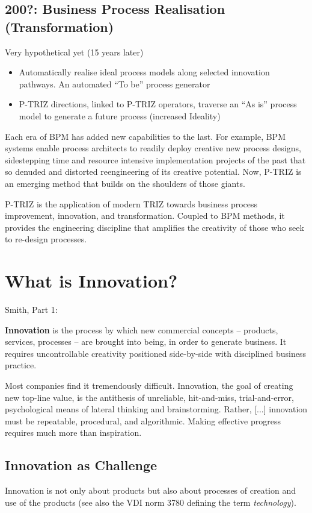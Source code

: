 \documentclass[11pt,a4paper]{article}
\begin{document}
\subsection{200?: Business Process Realisation (Transformation)}
Very hypothetical yet (15 years later)
\begin{itemize}
\item Automatically realise ideal process models along selected innovation
  pathways. An automated “To be” process generator
\item P-TRIZ directions, linked to P-TRIZ operators, traverse an “As is”
  process model to generate a future process (increased Ideality)
\end{itemize}

Each era of BPM has added new capabilities to the last. For example, BPM
systems enable process architects to readily deploy creative new process
designs, sidestepping time and resource intensive implementation projects of
the past that so denuded and distorted reengineering of its creative
potential. Now, P-TRIZ is an emerging method that builds on the shoulders of
those giants.

P-TRIZ is the application of modern TRIZ towards business process improvement,
innovation, and transformation. Coupled to BPM methods, it provides the
engineering discipline that amplifies the creativity of those who seek to
re-design processes.

\section{What is Innovation?}

Smith, Part 1:

\textbf{Innovation} is the process by which new commercial concepts –
products, services, processes – are brought into being, in order to generate
business. It requires uncontrollable creativity positioned side-by-side with
disciplined business practice.

Most companies find it tremendously difficult. Innovation, the goal of
creating new top-line value, is the antithesis of unreliable, hit-and-miss,
trial-and-error, psychological means of lateral thinking and brainstorming.
Rather, [...] innovation must be repeatable, procedural, and algorithmic.
Making effective progress requires much more than inspiration.

\subsection{Innovation as Challenge}
Innovation is not only about products but also about processes of creation and
use of the products (see also the VDI norm 3780 defining the term
\emph{technology}).
\end{document}
